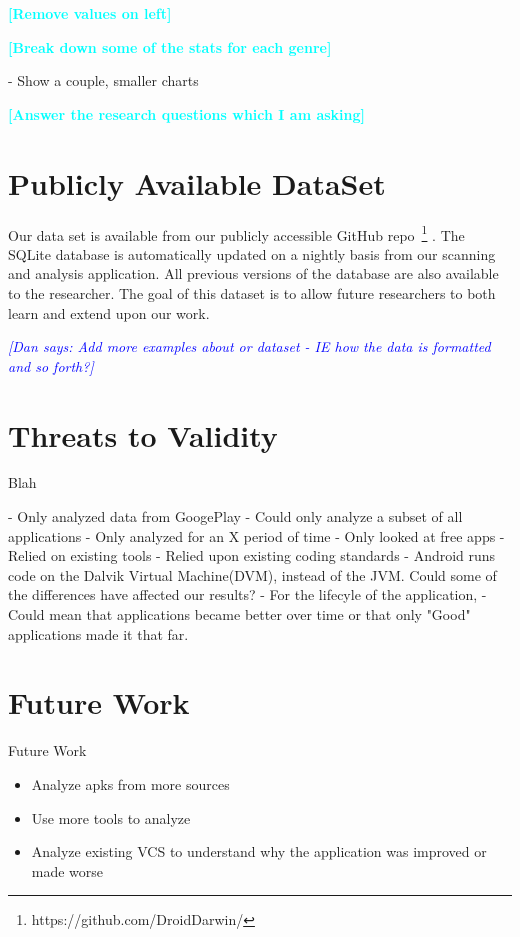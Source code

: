 \documentclass{sig-alternate}
\newcommand{\todo}[1]{\textcolor{cyan}{\textbf{[#1]}}}
\newcommand{\dan}[1]{\textcolor{blue}{{\it [Dan says: #1]}}}
\begin{document}
\todo{Remove values on left}







\todo{Break down some of the stats for each genre}



- Show a couple, smaller charts


\todo{Answer the research questions which I am asking}

\section{Publicly Available DataSet}

Our data set is available from our publicly accessible GitHub repo~\footnote{https://github.com/DroidDarwin/} . The SQLite database is automatically updated on a nightly basis from our scanning and analysis application. All previous versions of the database are also available to the researcher. The goal of this dataset is to allow future researchers to both learn and extend upon our work.

\dan{Add more examples about or dataset - IE how the data is formatted and so forth?}


\section{Threats to Validity}

 Blah


- Only analyzed data from GoogePlay
- Could only analyze a subset of all applications
- Only analyzed for an X period of time
- Only looked at free apps
- Relied on existing tools
- Relied upon existing coding standards
- Android runs code on the Dalvik Virtual Machine(DVM)\cite{Mirzaei:2012:TAA:2382756.2382798}, instead of the JVM. Could some of the differences have affected our results?
- For the lifecyle of the application, - Could mean that applications became better over time or that only "Good" applications made it that far.


\section{Future Work}
\label{sec: futurework}
Future Work


\begin{itemize}
  \item Analyze apks from more sources
  \item Use more tools to analyze
  \item  Analyze existing VCS to understand why the application was improved or made worse
\end{itemize}
\end{document}
